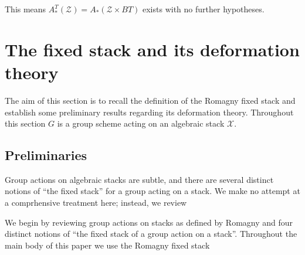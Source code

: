 \documentclass[12pt,dvipsnames]{amsart}
\begin{document}
This means \(A^T_*(\mathcal Z) = A_*(\mathcal Z\times BT)\) exists with no further hypotheses.

\section{The fixed stack and its deformation theory}\label{rl-0002}

The aim of this section is to recall the definition of the Romagny fixed stack and establish some preliminary results regarding its deformation theory. Throughout this section \(G\) is a group scheme acting on an algebraic stack \(\mathcal X\).

\subsection{Preliminaries}\label{rl-0003}
Group actions on algebraic stacks are subtle, and there are several distinct notions of ``the fixed stack'' for a group acting on a stack. We make no attempt at a comprhensive treatment here; instead, we review 

We begin by reviewing group actions on stacks as defined by Romagny \cite{romagny_GroupActionsStacks2005} and four distinct notions of ``the fixed stack of a group action on a stack''. Throughout the main body of this paper we use the Romagny fixed stack
\end{document}
